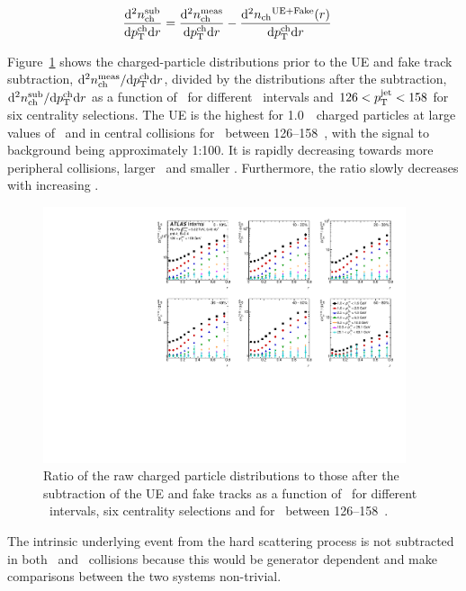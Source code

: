\begin{align}
\frac{\mathrm{d}^2 \mbox{$n_{\mathrm{ch}}^{\mathrm{sub}}$} }{ \mathrm{d} \mbox{$p_{\mathrm{T}}^{\mathrm{ch}}$} \mathrm{d} r } &=  \frac{\mathrm{d}^2 \mbox{$n_{\mathrm{ch}}^{\mathrm{meas}}$} }{ \mathrm{d} \mbox{$p_{\mathrm{T}}^{\mathrm{ch}}$} \mathrm{d} r} -  \frac{ \mathrm{d}^2 \mbox{$n_{\mathrm{ch}}$}^{\mathrm{UE+Fake}}(r)  }{ \mathrm{d} \mbox{$p_{\mathrm{T}}^{\mathrm{ch}}$} \mathrm{d} r} 
\end{align}

Figure~\ref{fig:UEsize} shows the charged-particle distributions prior to the UE and fake track subtraction, $ \mathrm{d}^2 \mbox{$n_{\mathrm{ch}}^{\mathrm{meas}}$} / \mathrm{d} \mbox{$p_{\mathrm{T}}^{\mathrm{ch}}$} \mathrm{d} r$, divided by the distributions after the subtraction, $ \mathrm{d}^2 \mbox{$n_{\mathrm{ch}}^{\mathrm{sub}}$} / \mathrm{d} \mbox{$p_{\mathrm{T}}^{\mathrm{ch}}$} \mathrm{d} r $ as a function of \rvar\ for different \pttrk\ intervals and $126 < \mbox{$p_{\mathrm{T}}^{\mathrm{jet}}$} < 158$ \GeV for six centrality selections. The UE is the highest for 1.0~\GeV\ charged particles at large values of \rvar\ and in central collisions for \ptjet\ between 126--158~\GeV, with the signal to background being approximately 1:100. It is rapidly decreasing towards more peripheral collisions, larger \pttrk\ and smaller \rvar. Furthermore, the ratio slowly decreases with increasing \ptjet.

\begin{figure}
\centerline{
 \includegraphics[width=0.95\textwidth]{figures/performance/UE_B2S_single_0.pdf} }
\caption{ Ratio of the raw charged particle distributions to those after the subtraction of the UE and fake tracks as a function of \rvar\ for different \pttrk\ intervals, six centrality selections and for \ptjet\ between 126--158~\GeV.}
\label{fig:UEsize}
\end{figure}

The intrinsic underlying event from the hard scattering process is not subtracted in both \pp\ and \pbpb\ collisions because this would be generator dependent and make comparisons between the two systems non-trivial. 

